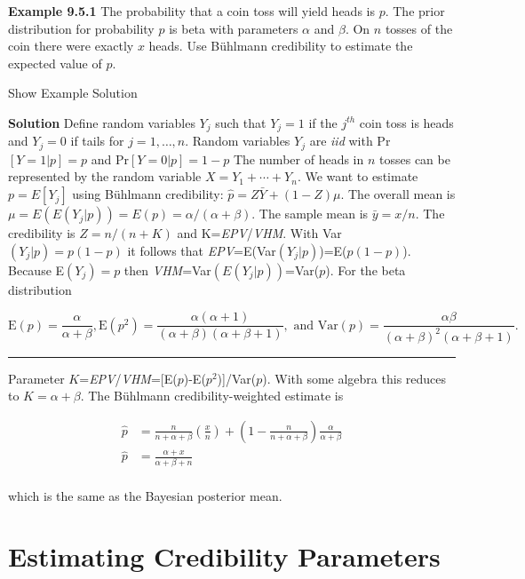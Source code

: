 \documentclass[]{book}
\theoremstyle{definition}
\theoremstyle{definition}
\theoremstyle{definition}
\theoremstyle{remark}
\begin{document}
\textbf{Example 9.5.1} The probability that a coin toss will yield heads
is \(p\). The prior distribution for probability \(p\) is beta with
parameters \(\alpha\) and \(\beta\). On \(n\) tosses of the coin there
were exactly \(x\) heads. Use Bühlmann credibility to estimate the
expected value of \(p\).

Show Example Solution

\hypertarget{toggleExampleCred.5.1}{}
\textbf{Solution} Define random variables \(Y_j\) such that \(Y_j=1\) if
the \(j^{th}\) coin toss is heads and \(Y_j=0\) if tails for
\(j=1,\ldots, n\). Random variables \(Y_j\) are \emph{iid} with
Pr\([Y=1|p]=p\) and Pr\([Y=0|p]=1-p\) The number of heads in \(n\)
tosses can be represented by the random variable \(X=Y_1+\cdots+Y_n\).
We want to estimate \(p=E[Y_j]\) using Bühlmann credibility:
\(\hat{p} = Z\bar{Y} +(1-Z)\mu\). The overall mean is
\(\mu=E(E(Y_j|p))=E(p)=\alpha/(\alpha+\beta)\). The sample mean is
\(\bar{y}=x/n\). The credibility is \(Z=n/(n+K)\) and
K=\emph{EPV}/\emph{VHM}. With Var\((Y_j|p)=p(1-p)\) it follows that
\emph{EPV}=E(Var\((Y_j|p)\))=E(\(p(1-p)\)). Because E\((Y_j)=p\) then
\emph{VHM}=Var\((E(Y_j|p))\)=Var(\(p\)). For the beta distribution

\begin{equation*}  
\mathrm{E}(p)=\frac{\alpha}{\alpha+\beta}, \mathrm{E}(p^2)=\frac{\alpha(\alpha+1)}{(\alpha+\beta)(\alpha+\beta+1)}, \textrm{ and } \mathrm{Var}(p)=\frac{\alpha\beta}{(\alpha+\beta)^2(\alpha+\beta+1)}.
\end{equation*}

\begin{center}\rule{0.5\linewidth}{\linethickness}\end{center}

Parameter
\(K\)=\emph{EPV}/\emph{VHM}={[}E(\(p\))-E(\(p^2\)){]}/Var(\(p\)). With
some algebra this reduces to \(K=\alpha+\beta\). The Bühlmann
credibility-weighted estimate is

\begin{align*}
  \hat{p} &= \frac{n}{n+\alpha+\beta}\left(\frac{x}{n}\right)+\left(1-\frac{n}{n+\alpha+\beta}\right)\frac{\alpha}{\alpha+\beta} \\
  \hat{p} & =\frac{\alpha+x}{\alpha+\beta+n}\\
\end{align*}

which is the same as the Bayesian posterior mean.

\section{Estimating Credibility
Parameters}\label{estimating-credibility-parameters}
\end{document}
